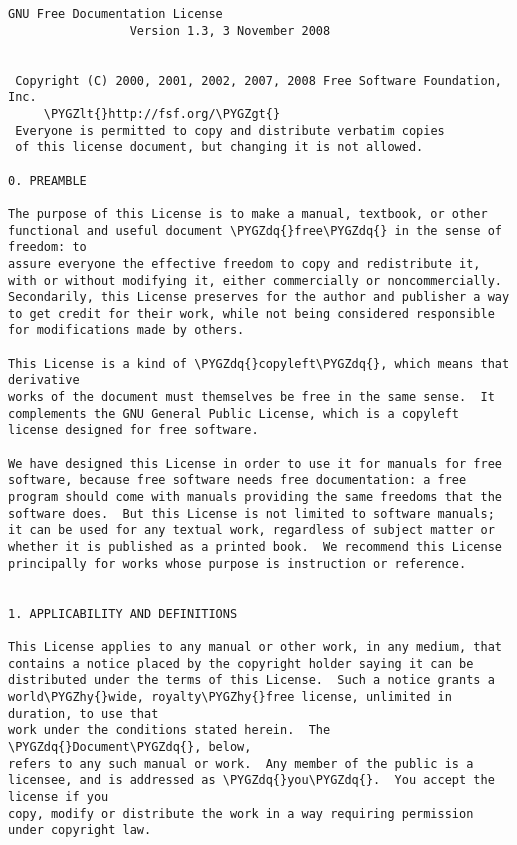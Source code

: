 \documentclass[letterpaper,10pt,english]{sphinxmanual}
\def\PYGZlt{\char`\<}
\def\PYGZgt{\char`\>}
\def\PYGZhy{\char`\-}
\def\PYGZdq{\char`\"}
\begin{document}
\begin{Verbatim}[frame=single,commandchars=\\\{\}]
                GNU Free Documentation License
                 Version 1.3, 3 November 2008


 Copyright (C) 2000, 2001, 2002, 2007, 2008 Free Software Foundation, Inc.
     \PYGZlt{}http://fsf.org/\PYGZgt{}
 Everyone is permitted to copy and distribute verbatim copies
 of this license document, but changing it is not allowed.

0. PREAMBLE

The purpose of this License is to make a manual, textbook, or other
functional and useful document \PYGZdq{}free\PYGZdq{} in the sense of freedom: to
assure everyone the effective freedom to copy and redistribute it,
with or without modifying it, either commercially or noncommercially.
Secondarily, this License preserves for the author and publisher a way
to get credit for their work, while not being considered responsible
for modifications made by others.

This License is a kind of \PYGZdq{}copyleft\PYGZdq{}, which means that derivative
works of the document must themselves be free in the same sense.  It
complements the GNU General Public License, which is a copyleft
license designed for free software.

We have designed this License in order to use it for manuals for free
software, because free software needs free documentation: a free
program should come with manuals providing the same freedoms that the
software does.  But this License is not limited to software manuals;
it can be used for any textual work, regardless of subject matter or
whether it is published as a printed book.  We recommend this License
principally for works whose purpose is instruction or reference.


1. APPLICABILITY AND DEFINITIONS

This License applies to any manual or other work, in any medium, that
contains a notice placed by the copyright holder saying it can be
distributed under the terms of this License.  Such a notice grants a
world\PYGZhy{}wide, royalty\PYGZhy{}free license, unlimited in duration, to use that
work under the conditions stated herein.  The \PYGZdq{}Document\PYGZdq{}, below,
refers to any such manual or work.  Any member of the public is a
licensee, and is addressed as \PYGZdq{}you\PYGZdq{}.  You accept the license if you
copy, modify or distribute the work in a way requiring permission
under copyright law.


\end{Verbatim}
\end{document}

